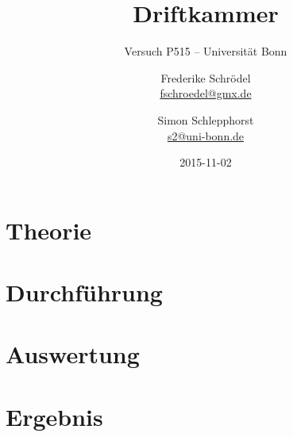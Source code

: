 \documentclass[11pt, ngerman, fleqn, DIV=15, headinclude, BCOR=2cm]{scrreprt}
\title{Driftkammer}
\subtitle{Versuch P515 -- Universität Bonn}
\author{
	Frederike Schrödel \\
	\small{\href{mailto:fschroedel@gmx.de}{fschroedel@gmx.de}}
	\and
	Simon Schlepphorst \\
	\small{\href{mailto:s2@uni-bonn.de}{s2@uni-bonn.de}}
}
\date{2015-11-02}
\begin{document}
\maketitle

\begin{abstract}
\end{abstract}

\tableofcontents

\chapter{Theorie}


\chapter{Durchführung}


\chapter{Auswertung}


\chapter{Ergebnis}




\begin{appendix}


\end{appendix}
\end{document}
